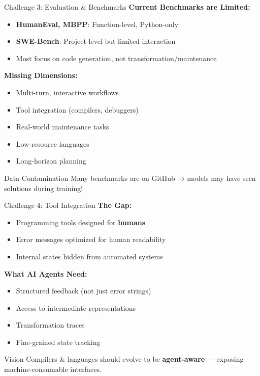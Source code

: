 \documentclass[aspectratio=169,10pt]{beamer}
\begin{document}
\begin{frame}{Challenge 3: Evaluation \& Benchmarks}
    \textbf{Current Benchmarks are Limited:}
    \begin{itemize}
        \item \textbf{HumanEval, MBPP}: Function-level, Python-only
        \item \textbf{SWE-Bench}: Project-level but limited interaction
        \item Most focus on code generation, not transformation/maintenance
    \end{itemize}
    
    \vspace{0.5em}
    \textbf{Missing Dimensions:}
    \begin{itemize}
        \item Multi-turn, interactive workflows
        \item Tool integration (compilers, debuggers)
        \item Real-world maintenance tasks
        \item Low-resource languages
        \item Long-horizon planning
    \end{itemize}
    
    \begin{alertblock}{Data Contamination}
    Many benchmarks are on GitHub → models may have seen solutions during training!
    \end{alertblock}
\end{frame}

\begin{frame}{Challenge 4: Tool Integration}
    \textbf{The Gap:}
    \begin{itemize}
        \item Programming tools designed for \textbf{humans}
        \item Error messages optimized for human readability
        \item Internal states hidden from automated systems
    \end{itemize}
    
    \textbf{What AI Agents Need:}
    \begin{itemize}
        \item Structured feedback (not just error strings)
        \item Access to intermediate representations
        \item Transformation traces
        \item Fine-grained state tracking
    \end{itemize}
    
    \begin{exampleblock}{Vision}
    Compilers \& languages should evolve to be \textbf{agent-aware} — exposing machine-consumable interfaces.
    \end{exampleblock}
\end{frame}
\end{document}
